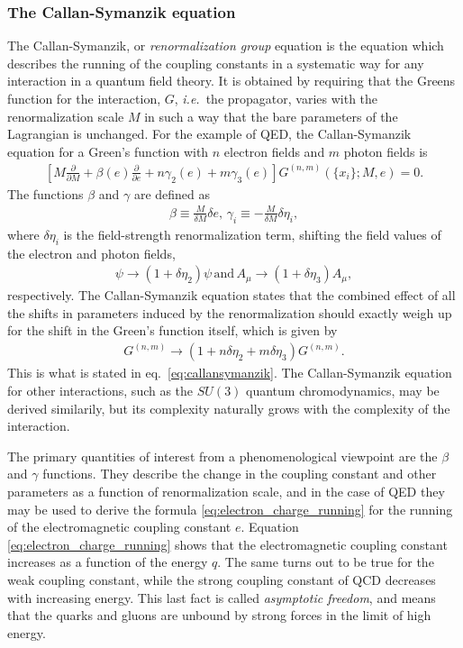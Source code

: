 \documentclass[twoside,english]{uiofysmaster}
\begin{document}
\subsubsection{The Callan-Symanzik equation}
The Callan-Symanzik, or {\it renormalization group} equation is the equation which describes the running of the coupling constants in a systematic way for any interaction in a quantum field theory. It is obtained by requiring that the Greens function for the interaction, $G$, {\it i.e.}\ the propagator, varies with the renormalization scale $M$ in such a way that the bare parameters of the Lagrangian is unchanged. For the example of QED, the Callan-Symanzik equation for a Green's function with $n$ electron fields and $m$ photon fields is
\begin{align}
	\left[ M \frac{\partial}{\partial M} + \beta(e) \frac{\partial}{\partial e} + n\gamma_2(e) + m\gamma_3(e)\right] G^{(n,m)}(\{ x_i\}; M,e) = 0.\label{eq:callansymanzik}
\end{align}
The functions $\beta$ and $\gamma$ are defined as
\begin{align}
	\beta \equiv \frac{M}{\delta M} \delta e, \, \gamma_i \equiv - \frac{M}{\delta M}\delta \eta_i,
\end{align}
where $\delta\eta_i$ is the field-strength renormalization term, shifting the field values of the electron and photon fields,
\begin{align}
	\psi \to (1 + \delta \eta_2) \psi \, \mathrm{and} \, A_\mu \to (1 + \delta\eta_3) A_\mu,
\end{align}
respectively. The Callan-Symanzik equation states that the combined effect of all the shifts in parameters induced by the renormalization should exactly weigh up for the shift in the Green's function itself, which is given by
\begin{align}
	G^{(n,m)} \to (1 + n\delta\eta_2 + m\delta\eta_3)G^{(n,m)}.
\end{align}
This is what is stated in eq.\ \eqref{eq:callansymanzik}. The Callan-Symanzik equation for other interactions, such as the $SU(3)$ quantum chromodynamics, may be derived similarily, but its complexity naturally grows with the complexity of the interaction.

The primary quantities of interest from a phenomenological viewpoint are the $\beta$ and $\gamma$ functions. They describe the change in the coupling constant and other parameters as a function of renormalization scale, and in the case of QED they may be used to derive the formula \eqref{eq:electron_charge_running} for the running of the electromagnetic coupling constant $e$. Equation \eqref{eq:electron_charge_running} shows that the electromagnetic coupling constant increases as a function of the energy $q$. The same turns out to be true for the weak coupling constant, while the strong coupling constant of QCD decreases with increasing energy. This last fact is called {\it asymptotic freedom}, and means that the quarks and gluons are unbound by strong forces in the limit of high energy. 
\end{document}
